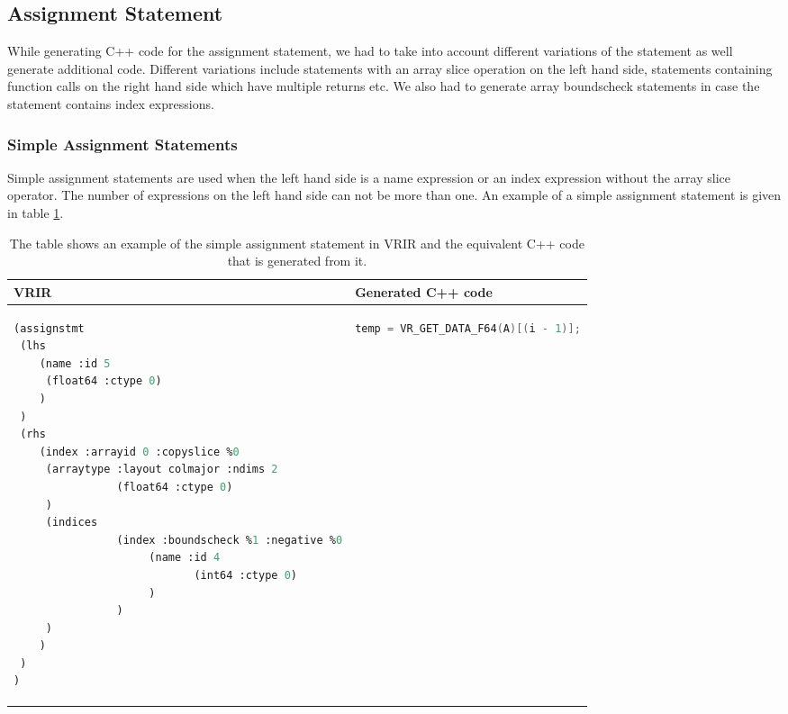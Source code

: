 					\subsection{Assignment Statement}
					While generating C++ code for the assignment statement, we had to take into account different variations of the statement as well generate additional code. Different variations include statements with an array slice operation on the left hand side, statements containing function calls on the right hand side which have multiple returns etc. We also had to generate array boundscheck statements in case the statement contains index expressions. 
					\subsubsection{Simple Assignment Statements}
					Simple assignment statements are used when the left hand side is a name expression or an index expression without the array slice operator. The number of expressions on the left hand side can not be more than one. An example of a simple assignment statement is given in table \ref{tab:simpleAssignment}.
	\begin{table}[htbp]
	\begin{tabular}{|l|l|}
					\hline
							VRIR & Generated C++ code\\
							\hline
{
\begin{lstlisting}[frame=none, language=lisp, label={lst:SimpleAssignment},numbers=none]
(assignstmt
 (lhs
	(name :id 5
	 (float64 :ctype 0)
	)
 )
 (rhs
	(index :arrayid 0 :copyslice %0
	 (arraytype :layout colmajor :ndims 2
				(float64 :ctype 0)
	 )
	 (indices
				(index :boundscheck %1 :negative %0
					 (name :id 4
							(int64 :ctype 0)
					 )
				)
	 )
	)
 )
)
\end{lstlisting}
} & 
{
\begin{lstlisting}[frame=none, language=c, label={lst:SimpleAssignment},numbers=none]
temp = VR_GET_DATA_F64(A)[(i - 1)];
\end{lstlisting}
} \\
\hline
\end{tabular}
\caption[Simple Assignment Statement]{ The table shows an example of the simple assignment statement in VRIR and the equivalent C++ code that is generated from it.}
\label{tab:simpleAssignment}
\end{table}
